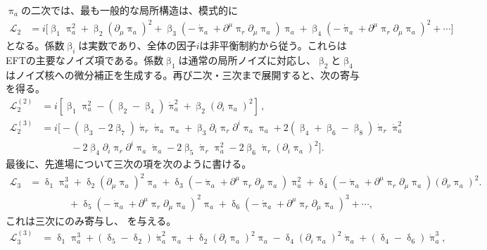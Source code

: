 \documentclass[a4paper,11pt,oneside]{article}
\theoremstyle{definition}
\numberwithin{equation}{section}
\begin{document}
\(\uppi_a\)の二次では、最も一般的な局所構造は、模式的に
\begin{align}\label{eq:diffquad}
    \mathcal{L}_2 &= i \Big[\upbeta_1 \uppi_{a}^2 + \upbeta_2 \left( \partial_\mu \uppi_{a}\right)^2 +\upbeta_3 \left(-\dot{\uppi}_{a} + \partial^\mu \uppi_{r} \partial_\mu \uppi_{a}\right)\uppi_{a} +\upbeta_4 \left(-\dot{\uppi}_{a} + \partial^\mu \uppi_{r} \partial_\mu \uppi_{a}\right)^2 + \cdots \Big]
\end{align}
となる。係数\(\upbeta_i\)は実数であり、全体の因子\(i\)は非平衡制約から従う。これらはEFTの主要なノイズ項である。係数\(\upbeta_1\)は通常の局所ノイズに対応し、\(\upbeta_2\)と\(\upbeta_4\)はノイズ核への微分補正を生成する。再び二次・三次まで展開すると、次の寄与を得る。
\begin{align}
\mathcal{L}_2^{(2)} &= i \left[\upbeta_1 \uppi_a^2 - \left(\upbeta_2 - \upbeta_4\right)\dot{\uppi}_a^2 + \upbeta_2 \left(\partial_i \uppi_{a} \right)^2\right]\,,\label{eq:piq2free}\\
\mathcal{L}_2^{(3)} &= i \Big[-(\upbeta_3 -2 \upbeta_7)\dot{\uppi}_{r} \dot{\uppi}_{a} \uppi_a + \upbeta_3 \partial_i \uppi_{r}  \partial^i \uppi_{a} \uppi_a +2 (\upbeta_4+\upbeta_6 - \upbeta_8) \dot{\uppi}_{r} \dot{\uppi}_a^2 \nonumber \\
& \qquad \quad - 2 \upbeta_4   \partial_i \uppi_{r}  \partial^i \uppi_{a} \dot{\uppi}_{a} - 2\upbeta_5 \dot{\uppi}_{r} \uppi_a^2  - 2 \upbeta_6 \dot{\uppi}_{r}(\partial_i\uppi_a)^2\Big].
\end{align}
最後に、先進場について三次の項を次のように書ける。
\begin{align}
        \mathcal{L}_3 &= \updelta_1 \uppi_a^3 + \updelta_2 (\partial_\mu \uppi_a)^2 \uppi_a + \updelta_3 \left(-\dot{\uppi}_{a} + \partial^\mu \uppi_{r} \partial_\mu \uppi_{a}\right) \uppi_a^2 + \updelta_4 \left(-\dot{\uppi}_{a} + \partial^\mu \uppi_{r} \partial_\mu \uppi_{a}\right) (\partial_\nu \uppi_a)^2 \Big.  \nonumber\\
        &\qquad \qquad + \updelta_5 \left(-\dot{\uppi}_{a} + \partial^\mu \uppi_{r} \partial_\mu \uppi_{a}\right)^2 \uppi_a  + \updelta_6 \left(-\dot{\uppi}_{a} + \partial^\mu \uppi_{r} \partial_\mu \uppi_{a}\right)^3 + \cdots,
    \end{align}
これは三次にのみ寄与し、
を与える。
\begin{align}
        \mathcal{L}_3^{(3)} &=\updelta_1 \uppi_a^3 + (\updelta_5- \updelta_2)  \dot{\uppi}_{a}^2 \uppi_a  + \updelta_2  (\partial_i \uppi_{a})^2 \uppi_a - \updelta_4  (\partial_i \uppi_{a})^2 \dot{\uppi}_a + (\updelta_4-\updelta_6)\dot{\uppi}_{a}^3 ,
    \end{align}
\end{document}
